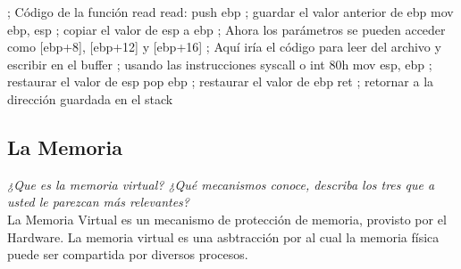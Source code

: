 \documentclass[../main.tex]{subfiles}
\begin{document}
\begin{exercise}
            ; Código de la función read read: push ebp ; guardar el valor anterior de ebp mov ebp, esp ; copiar el valor de esp a ebp ; Ahora los parámetros se pueden acceder como [ebp+8], [ebp+12] y [ebp+16] ; Aquí iría el código para leer del archivo y escribir en el buffer ; usando las instrucciones syscall o int 80h mov esp, ebp ; restaurar el valor de esp pop ebp ; restaurar el valor de ebp ret ; retornar a la dirección guardada en el stack
    \end{exercise}
    
    \begin{exercise}
    \end{exercise}

\subsection{La Memoria}
    \begin{exercise}
        \textit{¿Que es la memoria virtual? ¿Qué mecanismos conoce, describa los tres que a usted le parezcan más relevantes?}\\

        La Memoria Virtual es un mecanismo de protección de memoria, provisto por el Hardware. La memoria virtual es una asbtracción por al cual la memoria física puede ser compartida por diversos procesos.
    \end{exercise}
\end{document}
